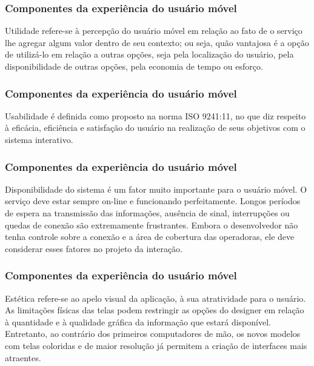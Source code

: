 \documentclass[presentation]{beamer}
\begin{document}
\begin{frame}[c]\frametitle{Componentes da experiência do usuário móvel}
    
    \begin{block}{Utilidade}
        refere-se à percepção do usuário móvel em relação ao fato de o serviço lhe agregar algum valor dentro de seu contexto; ou seja, quão vantajosa é a opção de utilizá-lo em relação a outras opções, seja pela localização do usuário, pela disponibilidade de outras opções, pela economia de tempo ou esforço.
    \end{block}

\end{frame}

\begin{frame}[c]\frametitle{Componentes da experiência do usuário móvel}
    
    \begin{block}{Usabilidade}
        é definida como proposto na norma ISO 9241:11, no que diz respeito à eficácia, eficiência e satisfação do usuário na realização de seus objetivos com o sistema interativo.
    \end{block}

\end{frame}

\begin{frame}[c]\frametitle{Componentes da experiência do usuário móvel}
    
    \begin{block}{Disponibilidade do sistema}
        é um fator muito importante para o usuário móvel. O serviço deve estar sempre on-line e funcionando perfeitamente. Longos períodos de espera na transmissão das informações, ausência de sinal, interrupções ou quedas de conexão são extremamente frustrantes. Embora o desenvolvedor não tenha controle sobre a conexão e a área de cobertura das operadoras, ele deve considerar esses fatores no projeto da interação.
    \end{block}

\end{frame}

\begin{frame}[c]\frametitle{Componentes da experiência do usuário móvel}
    
    \begin{block}{Estética}
        refere-se ao apelo visual da aplicação, à sua atratividade para o usuário. As limitações físicas das telas podem restringir as opções do designer em relação à quantidade e à qualidade gráfica da informação que estará disponível. Entretanto, ao contrário dos primeiros computadores de mão, os novos modelos com telas coloridas e de maior resolução já permitem a criação de interfaces mais atraentes.
    \end{block}

\end{frame}
\end{document}

